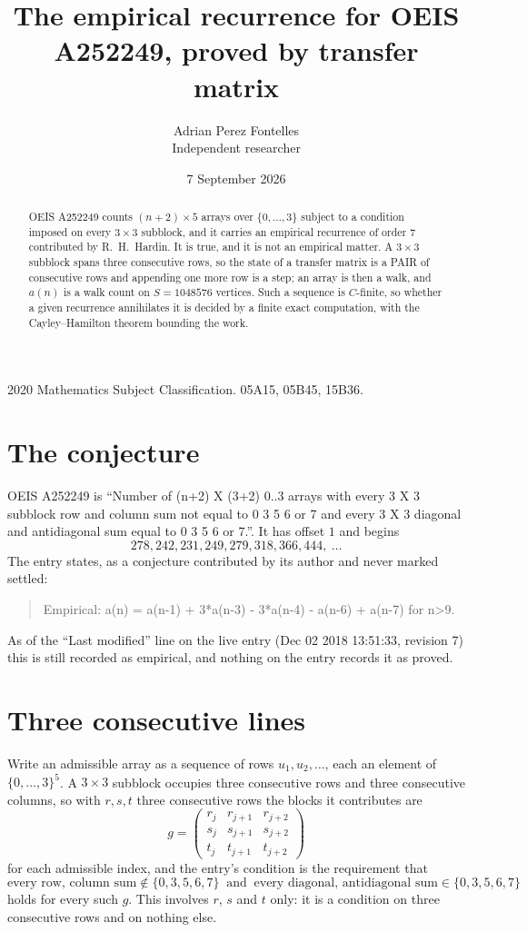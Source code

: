 \documentclass[11pt,a4paper]{article}
\title{The empirical recurrence for OEIS A252249, proved by transfer matrix}
\author{Adrian Perez Fontelles\\ \small Independent researcher}
\date{7 September 2026}
\theoremstyle{plain}
\theoremstyle{definition}
\begin{document}
\maketitle

\begin{abstract}
OEIS A252249 counts $(n+2)\times5$ arrays over $\{0,\dots,3\}$ subject to a condition imposed on
every $3\times3$ subblock, and it carries an empirical recurrence of order $7$
contributed by R.~H.~Hardin. It is true, and it is not an empirical matter. A $3\times3$
subblock spans three consecutive rows, so the state of a transfer matrix is a PAIR of
consecutive rows and appending one more row is a step; an array is then a walk, and
$a(n)$ is a walk count on $S=1048576$ vertices. Such a sequence is $C$-finite, so whether a given
recurrence annihilates it is decided by a finite exact computation, with the Cayley--Hamilton
theorem bounding the work.
\end{abstract}

\noindent\small 2020 Mathematics Subject Classification. 05A15, 05B45, 15B36.\normalsize

\section{The conjecture}

OEIS A252249 is ``Number of (n+2) X (3+2) 0..3 arrays with every 3 X 3 subblock row and column sum not equal to 0 3 5 6 or 7 and every 3 X 3 diagonal and antidiagonal sum equal to 0 3 5 6 or 7.''. It has offset $1$ and begins
\[
278, 242, 231, 249, 279, 318, 366, 444,\ \dots
\]
The entry states, as a conjecture contributed by its author and never marked settled:
\begin{quote}
Empirical: a(n) = a(n-1) + 3*a(n-3) - 3*a(n-4) - a(n-6) + a(n-7) for n>9.
\end{quote}
As of the ``Last modified'' line on the live entry (Dec 02 2018 13:51:33, revision 7) this is still
recorded as empirical, and nothing on the entry records it as proved.

\section{Three consecutive lines}

Write an admissible array as a sequence of rows $u_1,u_2,\dots$, each an element of
$\{0,\dots,3\}^{5}$. A $3\times3$ subblock occupies three consecutive rows and
three consecutive columns, so with $r,s,t$ three consecutive rows the blocks it
contributes are
\[
g=\begin{pmatrix}r_j&r_{j+1}&r_{j+2}\\ s_j&s_{j+1}&s_{j+2}\\ t_j&t_{j+1}&t_{j+2}\end{pmatrix}
\]
for each admissible index, and the entry's condition is the requirement that
\[
\text{every row, column sum} \notin \{0,3,5,6,7\}\ \text{ and }\ \text{every diagonal, antidiagonal sum} \in \{0,3,5,6,7\}
\]
holds for every such $g$. This involves $r$, $s$ and $t$ only: it is a condition on
three consecutive rows and on nothing else.
\end{document}
